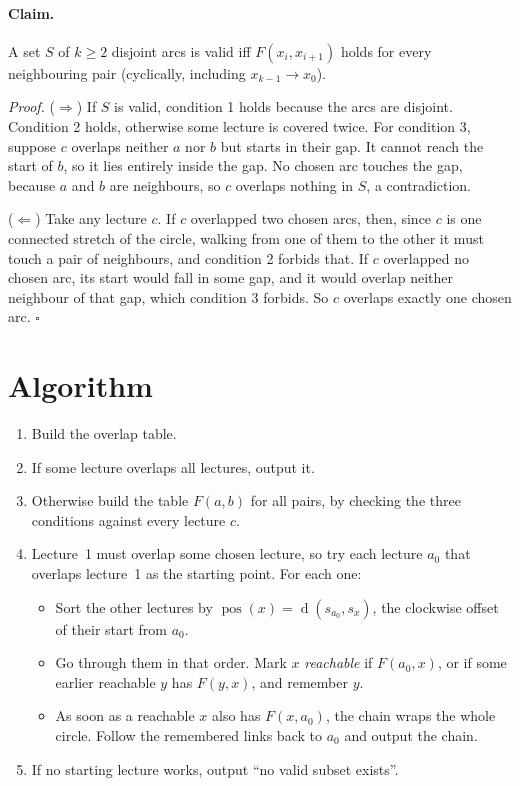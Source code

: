 \documentclass[11pt,a4paper]{article}
\newcommand{\dist}{\operatorname{d}}
\newcommand{\pos}{\operatorname{pos}}
\begin{document}
\paragraph{Claim.} A set $S$ of $k\ge2$ disjoint arcs is valid iff $F(x_i,x_{i+1})$
holds for every neighbouring pair (cyclically, including $x_{k-1}\to x_0$).

\emph{Proof.} ($\Rightarrow$) If $S$ is valid, condition 1 holds because the
arcs are disjoint. Condition 2 holds, otherwise some lecture is covered twice.
For condition 3, suppose $c$ overlaps neither $a$ nor $b$ but starts in their
gap. It cannot reach the start of $b$, so it lies entirely inside the gap. No
chosen arc touches the gap, because $a$ and $b$ are neighbours, so $c$ overlaps
nothing in $S$, a contradiction.

($\Leftarrow$) Take any lecture $c$. If $c$ overlapped two chosen arcs, then, since
$c$ is one connected stretch of the circle, walking from one of them to the other
it must touch a pair of neighbours, and condition 2 forbids that. If $c$
overlapped no chosen arc, its start would fall in some gap, and it would overlap
neither neighbour of that gap, which condition 3 forbids. So $c$
overlaps exactly one chosen arc. $\square$

\section{Algorithm}

\begin{enumerate}
  \item Build the overlap table.
  \item If some lecture overlaps all lectures, output it.
  \item Otherwise build the table $F(a,b)$ for all pairs, by checking the three
  conditions against every lecture $c$.
  \item Lecture~1 must overlap some chosen lecture, so try each lecture $a_0$
  that overlaps lecture~1 as the starting point. For each one:
  \begin{itemize}
    \item Sort the other lectures by $\pos(x)=\dist(s_{a_0},s_x)$, the clockwise
    offset of their start from $a_0$.
    \item Go through them in that order. Mark $x$ \emph{reachable} if
    $F(a_0,x)$, or if some earlier reachable $y$ has $F(y,x)$, and remember $y$.
    \item As soon as a reachable $x$ also has $F(x,a_0)$, the chain wraps the
    whole circle. Follow the remembered links back to $a_0$ and output the chain.
  \end{itemize}
  \item If no starting lecture works, output ``no valid subset exists''.
\end{enumerate}
\end{document}
